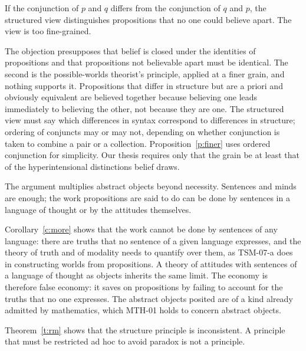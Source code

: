 \documentclass{situationist-preprint}
\begin{document}
\begin{objection}\label{o:fine}
If the conjunction of $p$ and $q$ differs from the conjunction of $q$ and $p$, the structured view distinguishes propositions that no one could believe apart. The view is too fine-grained.
\end{objection}

\begin{reply}
The objection presupposes that belief is closed under the identities of propositions and that propositions not believable apart must be identical. The second is the possible-worlds theorist's principle, applied at a finer grain, and nothing supports it. Propositions that differ in structure but are a priori and obviously equivalent are believed together because believing one leads immediately to believing the other, not because they are one. The structured view must say which differences in syntax correspond to differences in structure; ordering of conjuncts may or may not, depending on whether conjunction is taken to combine a pair or a collection. Proposition~\ref{p:finer} uses ordered conjunction for simplicity. Our thesis requires only that the grain be at least that of the hyperintensional distinctions belief draws.
\end{reply}

\begin{objection}\label{o:econ}
The argument multiplies abstract objects beyond necessity. Sentences and minds are enough; the work propositions are said to do can be done by sentences in a language of thought or by the attitudes themselves.
\end{objection}

\begin{reply}
Corollary~\ref{c:more} shows that the work cannot be done by sentences of any language: there are truths that no sentence of a given language expresses, and the theory of truth and of modality needs to quantify over them, as TSM-07-a does in constructing worlds from propositions. A theory of attitudes with sentences of a language of thought as objects inherits the same limit. The economy is therefore false economy: it saves on propositions by failing to account for the truths that no one expresses. The abstract objects posited are of a kind already admitted by mathematics, which MTH-01 holds to concern abstract objects.
\end{reply}

\begin{objection}\label{o:rm}
Theorem~\ref{t:rm} shows that the structure principle is inconsistent. A principle that must be restricted ad hoc to avoid paradox is not a principle.
\end{objection}
\end{document}
